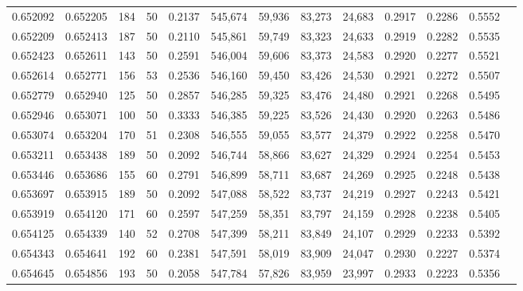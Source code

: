 \begin{tabular}{rrrrrrrrrrrrr}
0.652092 & 0.652205 &   184 &  50 &                                     0.2137 & 545,674 &  59,936 &  83,273 &  24,683 & 0.2917 & 0.2286 & 0.5552 \\
0.652209 & 0.652413 &   187 &  50 &                                     0.2110 & 545,861 &  59,749 &  83,323 &  24,633 & 0.2919 & 0.2282 & 0.5535 \\
0.652423 & 0.652611 &   143 &  50 &                                     0.2591 & 546,004 &  59,606 &  83,373 &  24,583 & 0.2920 & 0.2277 & 0.5521 \\
0.652614 & 0.652771 &   156 &  53 &                                     0.2536 & 546,160 &  59,450 &  83,426 &  24,530 & 0.2921 & 0.2272 & 0.5507 \\
0.652779 & 0.652940 &   125 &  50 &                                     0.2857 & 546,285 &  59,325 &  83,476 &  24,480 & 0.2921 & 0.2268 & 0.5495 \\
0.652946 & 0.653071 &   100 &  50 &                                     0.3333 & 546,385 &  59,225 &  83,526 &  24,430 & 0.2920 & 0.2263 & 0.5486 \\
0.653074 & 0.653204 &   170 &  51 &                                     0.2308 & 546,555 &  59,055 &  83,577 &  24,379 & 0.2922 & 0.2258 & 0.5470 \\
0.653211 & 0.653438 &   189 &  50 &                                     0.2092 & 546,744 &  58,866 &  83,627 &  24,329 & 0.2924 & 0.2254 & 0.5453 \\
0.653446 & 0.653686 &   155 &  60 &                                     0.2791 & 546,899 &  58,711 &  83,687 &  24,269 & 0.2925 & 0.2248 & 0.5438 \\
0.653697 & 0.653915 &   189 &  50 &                                     0.2092 & 547,088 &  58,522 &  83,737 &  24,219 & 0.2927 & 0.2243 & 0.5421 \\
0.653919 & 0.654120 &   171 &  60 &                                     0.2597 & 547,259 &  58,351 &  83,797 &  24,159 & 0.2928 & 0.2238 & 0.5405 \\
0.654125 & 0.654339 &   140 &  52 &                                     0.2708 & 547,399 &  58,211 &  83,849 &  24,107 & 0.2929 & 0.2233 & 0.5392 \\
0.654343 & 0.654641 &   192 &  60 &                                     0.2381 & 547,591 &  58,019 &  83,909 &  24,047 & 0.2930 & 0.2227 & 0.5374 \\
0.654645 & 0.654856 &   193 &  50 &                                     0.2058 & 547,784 &  57,826 &  83,959 &  23,997 & 0.2933 & 0.2223 & 0.5356 \\

\end{tabular}
